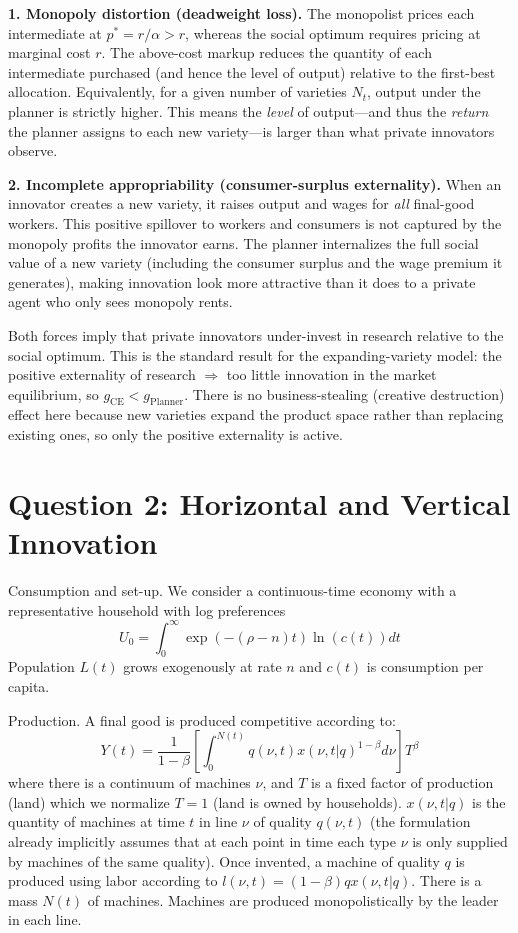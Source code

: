 \documentclass[11pt]{exam}
\begin{document}
\begin{questions}
\begin{solution}
\textbf{1. Monopoly distortion (deadweight loss).}  The monopolist prices each intermediate at $p^{*}=r/\alpha>r$, whereas the social optimum requires pricing at marginal cost $r$.  The above-cost markup reduces the quantity of each intermediate purchased (and hence the level of output) relative to the first-best allocation.  Equivalently, for a given number of varieties $N_{t}$, output under the planner is strictly higher.  This means the \emph{level} of output—and thus the \emph{return} the planner assigns to each new variety—is larger than what private innovators observe.

\textbf{2. Incomplete appropriability (consumer-surplus externality).}  When an innovator creates a new variety, it raises output and wages for \emph{all} final-good workers.  This positive spillover to workers and consumers is not captured by the monopoly profits the innovator earns.  The planner internalizes the full social value of a new variety (including the consumer surplus and the wage premium it generates), making innovation look more attractive than it does to a private agent who only sees monopoly rents.

Both forces imply that private innovators under-invest in research relative to the social optimum.  This is the standard result for the expanding-variety model: the positive externality of research $\Rightarrow$ too little innovation in the market equilibrium, so $g_{\text{CE}}<g_{\text{Planner}}$.  There is no business-stealing (creative destruction) effect here because new varieties expand the product space rather than replacing existing ones, so only the positive externality is active.
\end{solution}

\end{questions}

\section{Question 2: Horizontal and Vertical Innovation}

Consumption and set-up. We consider a continuous-time economy with a representative household with log preferences
\[
	U_{0}=\int_{0}^{\infty}\exp(-(\rho-n)t)\ln(c(t))dt
\]
Population $L(t)$ grows exogenously at rate $n$ and $c(t)$ is consumption per capita.

Production. A final good is produced competitive according to:
\[
	Y(t)=\frac{1}{1-\beta}\left[\int_{0}^{N(t)}q(\nu,t)x(\nu,t|q)^{1-\beta}d\nu\right]T^{\beta}
\]
where there is a continuum of machines $\nu$, and $T$ is a fixed factor of production (land) which we normalize $T=1$ (land is owned by households). $x(\nu,t|q)$ is the quantity of machines at time $t$ in line $\nu$ of quality $q(\nu,t)$ (the formulation already implicitly assumes that at each point in time each type $\nu$ is only supplied by machines of the same quality). Once invented, a machine of quality $q$ is produced using labor according to $l(\nu,t)=(1-\beta)qx(\nu,t|q)$. There is a mass $N(t)$ of machines. Machines are produced monopolistically by the leader in each line.
\end{document}
